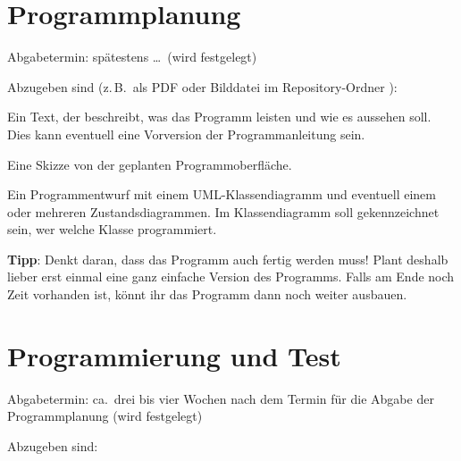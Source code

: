\section{Programmplanung}

Abgabetermin: spätestens \ldots\ (wird festgelegt)

Abzugeben sind (z.\,B.\ als PDF oder Bilddatei im Repository-Ordner ):

\begin{compactitem}
\item Ein Text, der beschreibt, was das Programm leisten und wie es aussehen
soll. Dies kann eventuell eine Vorversion der Programmanleitung sein.

\item Eine Skizze von der geplanten Programmoberfläche.

\item Ein Programmentwurf mit einem UML-Klassendiagramm und eventuell einem oder
mehreren Zustandsdiagrammen. Im Klassendiagramm soll gekennzeichnet sein, wer
welche Klasse programmiert.
\end{compactitem}

\textbf{Tipp}: Denkt daran, dass das Programm auch fertig werden muss! Plant
deshalb lieber erst einmal eine ganz einfache Version des Programms. Falls am
Ende noch Zeit vorhanden ist, könnt ihr das Programm dann noch weiter ausbauen.


\section{Programmierung und Test}

Abgabetermin: ca.\ drei bis vier Wochen nach dem Termin für die Abgabe der
Programmplanung (wird festgelegt)

Abzugeben sind:

